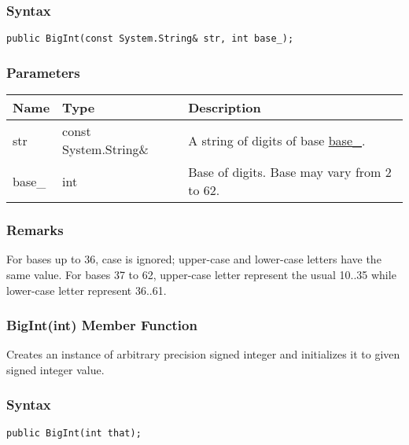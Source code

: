 \documentclass[a4paper,oneside,11.000000pt]{book}
\begin{document}
\subsubsection*{Syntax}
\texttt{public BigInt(const System.String\& str, int base\_);}
\subsubsection*{Parameters}
\begin{flushleft}
\begin{supertabular}[l]{!{\raggedright}p{1.30721cm}!{\raggedright}p{4.63128cm}!{\raggedright}p{5.23538cm}}
\textbf{Name}
& \textbf{Type}
& \textbf{Description}
\\
\hline
str
& const System.\-String\&\-
& A string of digits of base \hyperlink{System.Numerics.Multiprecision.BigInt.constructor.P.System.Numerics.Multiprecision.BigInt.C.R.System.String.int.base\_}{base\_\-}.

\\
base\_
& int
& Base of digits. Base may vary from 2 to 62.

\\
\end{supertabular}

\end{flushleft}
\subsubsection*{Remarks}
\begin{flushleft}
For bases up to 36, case is ignored; upper-case and lower-case letters have the same value. 
For bases 37 to 62, upper-case letter represent the usual 10..35 while lower-case letter represent 36..61.

\end{flushleft}
\clearpage

\hypertarget{System.Numerics.Multiprecision.BigInt.constructor.P.System.Numerics.Multiprecision.BigInt.int}{\subsubsection*{BigInt(int) Member Function}}
\begin{flushleft}
Creates an instance of arbitrary precision signed integer and initializes it to given signed integer value.

\end{flushleft}
\subsubsection*{Syntax}\texttt{public BigInt(int that);}
\end{document}
